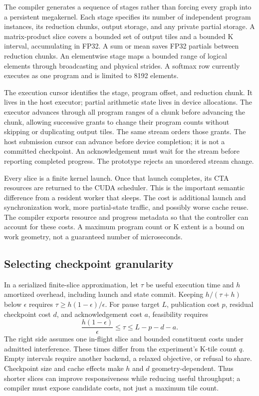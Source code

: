 The compiler generates a sequence of stages rather than forcing every graph
into a persistent megakernel. Each stage specifies its number of independent
program instances, its reduction chunks, output storage, and any private
partial storage. A matrix-product slice covers a bounded set of output tiles
and a bounded K interval, accumulating in FP32. A sum or mean saves FP32
partials between reduction chunks. An elementwise stage maps a bounded
range of logical elements through broadcasting and physical strides. A
softmax row currently executes as one program and is limited to 8192 elements.

The execution cursor identifies the stage, program offset, and reduction
chunk. It lives in the host executor; partial arithmetic state lives in
device allocations. The executor advances through all program ranges of a
chunk before advancing the chunk, allowing successive grants to change
their program counts without skipping or duplicating output tiles. The
same stream orders those grants. The host submission cursor can advance before
device completion; it is not a committed checkpoint. An acknowledgement must
wait for the stream before reporting completed progress. The prototype rejects
an unordered stream change.

Every slice is a finite kernel launch. Once that launch completes, its CTA
resources are returned to the CUDA scheduler. This is the important semantic
difference from a resident worker that sleeps. The cost is additional launch
and synchronization work, more partial-state traffic, and possibly worse
cache reuse. The compiler exports resource and progress metadata so that the
controller can account for these costs. A maximum program count or K extent
is a bound on work geometry, not a guaranteed number of microseconds.

\subsection{Selecting checkpoint granularity}
In a serialized finite-slice approximation, let $\tau$ be useful execution
time and $h$ amortized overhead, including launch and state commit. Keeping
$h/(\tau+h)$ below $\epsilon$ requires $\tau\geq h(1-\epsilon)/\epsilon$.
For pause target $L$, publication cost $p$, residual checkpoint cost $d$,
and acknowledgement cost $a$, feasibility requires
\begin{equation}
 \frac{h(1-\epsilon)}{\epsilon}\leq\tau\leq L-p-d-a.
 \label{eq:quantum}
\end{equation}
The right side assumes one in-flight slice and bounded constituent costs
under admitted interference. These times differ from the experiment's K-tile
count $q$. Empty intervals require another backend, a relaxed objective,
or refusal to share. Checkpoint size and cache effects make $h$ and $d$
geometry-dependent. Thus shorter slices can improve responsiveness while
reducing useful throughput; a compiler must expose candidate costs, not
just a maximum tile count.


